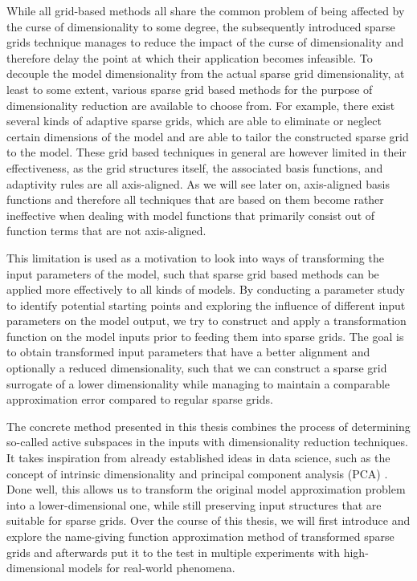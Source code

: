 \documentclass[
  a4paper,  %
  twoside,  %
  bibliography=totoc,
  headsepline,
  cleardoublepage=empty,
  parskip=half,
  draft=false
]{scrbook}
\begin{document}
While all grid-based methods all share the common problem of being affected by the curse of dimensionality to some degree, the subsequently introduced sparse grids technique \cite{Zenger1991} manages to reduce the impact of the curse of dimensionality and therefore delay the point at which their application becomes infeasible.
To decouple the model dimensionality from the actual sparse grid dimensionality, at least to some extent, various sparse grid based methods for the purpose of dimensionality reduction are available to choose from.
For example, there exist several kinds of adaptive sparse grids, which are able to eliminate or neglect certain dimensions of the model and are able to tailor the constructed sparse grid to the model.
These grid based techniques in general are however limited in their effectiveness, as the grid structures itself, the associated basis functions, and adaptivity rules are all axis-aligned.
As we will see later on, axis-aligned basis functions and therefore all techniques that are based on them become rather ineffective when dealing with model functions that primarily consist out of function terms that are not axis-aligned.

This limitation is used as a motivation to look into ways of transforming the input parameters of the model, such that sparse grid based methods can be applied more effectively to all kinds of models.
By conducting a parameter study to identify potential starting points and exploring the influence of different input parameters on the model output, we try to construct and apply a transformation function on the model inputs prior to feeding them into sparse grids.
The goal is to obtain transformed input parameters that have a better alignment and optionally a reduced dimensionality, such that we can construct a sparse grid surrogate of a lower dimensionality while managing to maintain a comparable approximation error compared to regular sparse grids.

The concrete method presented in this thesis combines the process of determining so-called active subspaces in the inputs \cite{Constantine2015} with dimensionality reduction techniques.
It takes inspiration from already established ideas in data science, such as the concept of intrinsic dimensionality \cite{Bennett1969} and principal component analysis (PCA) \cite{Abdi2010}.
Done well, this allows us to transform the original model approximation problem into a lower-dimensional one, while still preserving input structures that are suitable for sparse grids.
Over the course of this thesis, we will first introduce and explore the name-giving function approximation method of transformed sparse grids and afterwards put it to the test in multiple experiments with high-dimensional models for real-world phenomena.
\end{document}
